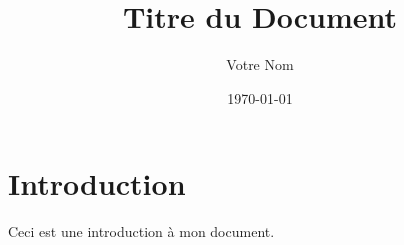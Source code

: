 \documentclass[a4paper,12pt]{article}
\title{Titre du Document}
\author{Votre Nom}
\date{\today}
\begin{document}
\maketitle

\section{Introduction}

Ceci est une introduction à mon document.
\end{document}
